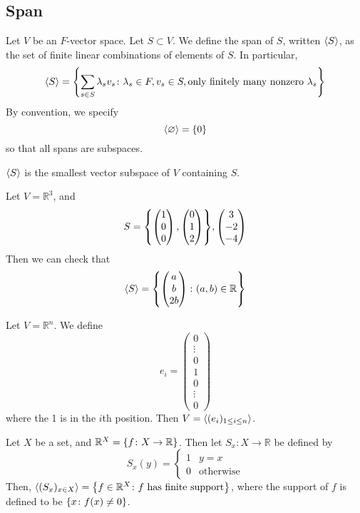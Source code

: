 \subsection{Span}
\begin{definition}
	Let \( V \) be an \( F \)-vector space.
	Let \( S \subset V \).
	We define the span of \( S \), written \( \langle{} S \rangle \), as the set of finite linear combinations of elements of \( S \).
	In particular,
	\[
		\langle{} S \rangle = \qty{ \sum_{s \in S} \lambda_s v_s \colon \lambda_s \in F, v_s \in S, \text{only finitely many nonzero } \lambda_s }
	\]
	By convention, we specify
	\[
		\langle{} \varnothing \rangle = \qty{0}
	\]
	so that all spans are subspaces.
\end{definition}
\begin{remark}
	\( \langle{} S \rangle \) is the smallest vector subspace of \( V \) containing \( S \).
\end{remark}
\begin{example}
	Let \( V = \mathbb R^3 \), and
	\[
		S = \qty{ \begin{pmatrix}
				1 \\ 0 \\ 0
			\end{pmatrix}, \begin{pmatrix}
				0 \\ 1 \\ 2
			\end{pmatrix} }, \begin{pmatrix}
			3 \\ -2 \\ -4
		\end{pmatrix}
	\]
	Then we can check that
	\[
		\langle{} S \rangle = \qty{\begin{pmatrix}
				a \\ b \\ 2b
			\end{pmatrix} \colon (a,b) \in \mathbb R}
	\]
\end{example}
\begin{example}
	Let \( V = \mathbb R^n \).
	We define
	\[
		e_i = \begin{pmatrix}
			0 \\ \vdots \\ 0 \\ 1 \\ 0 \\ \vdots \\ 0
		\end{pmatrix}
	\]
	where the 1 is in the \( i \)th position.
	Then \( V = \langle{} (e_i)_{1 \leq i \leq n} \rangle \).
\end{example}
\begin{example}
	Let \( X \) be a set, and \( \mathbb R^X = \qty{f \colon X \to \mathbb R} \).
	Then let \( S_x \colon X \to \mathbb R \) be defined by
	\[
		S_x(y) = \begin{cases}
			1 & y = x            \\
			0 & \text{otherwise}
		\end{cases}
	\]
	Then, \( \langle{} (S_x)_{x \in X} \rangle = \qty{f \in \mathbb R^X \colon f \text{ has finite support}} \),
	where the support of \( f \) is defined to be \( \qty{x \colon f(x) \neq 0} \).
\end{example}


